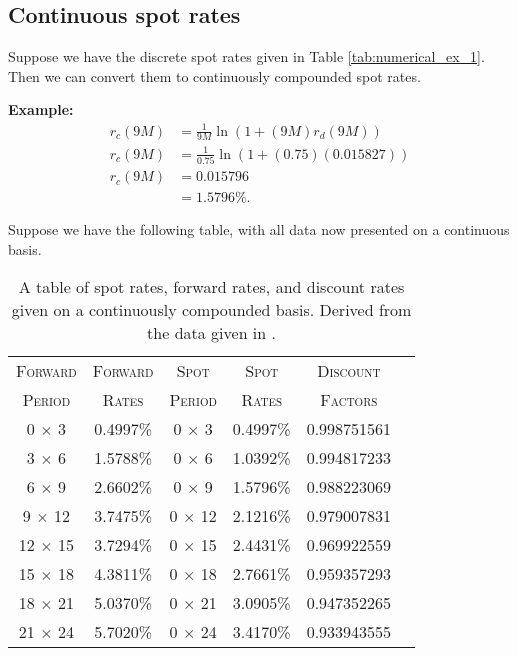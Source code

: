 \subsection{Continuous spot rates}

Suppose we have the discrete spot rates given in Table \ref{tab:numerical_ex_1}. Then we can convert them to continuously compounded spot rates.

\textbf{Example:}
\begin{align}
    r_c(9M) &= \frac{1}{9M} \ln \left( 1 + (9M) r_d(9M)  \right) \\[6pt]
    r_c(9M) &= \frac{1}{0.75} \ln \left( 1 + (0.75)(0.015827) \right) \\[6pt]
    r_c(9M) &= 0.015796 \\
    &= 1.5796\%.
\end{align}

Suppose we have the following table, with all data now presented on a continuous basis.

\begin{table}[ht]
\begin{center}
\begin{tabular}{cccccc}

\toprule
\textsc{Forward} & \textsc{Forward} & \textsc{Spot} & \textsc{Spot} & \textsc{Discount} \\
\textsc{Period} & \textsc{Rates} & \textsc{Period} & \textsc{Rates} & \textsc{Factors}\\
\toprule

0 $\times$ 3 & 0.4997\% & 0 $\times$ 3 & 0.4997\% & 0.998751561 \\
3 $\times$ 6 & 1.5788\% & 0 $\times$ 6 & 1.0392\% & 0.994817233 \\
6 $\times$ 9 & 2.6602\% & 0 $\times$ 9 & 1.5796\% & 0.988223069 \\
9 $\times$ 12 & 3.7475\% & 0 $\times$ 12 & 2.1216\% & 0.979007831 \\
12 $\times$ 15 & 3.7294\% & 0 $\times$ 15 & 2.4431\% & 0.969922559 \\
15 $\times$ 18 & 4.3811\% & 0 $\times$ 18 & 2.7661\% & 0.959357293 \\
18 $\times$ 21 & 5.0370\% & 0 $\times$ 21 & 3.0905\% & 0.947352265 \\
21 $\times$ 24 & 5.7020\% & 0 $\times$ 24 & 3.4170\% & 0.933943555 \\
\toprule

\end{tabular}
\end{center}
\caption[Numerical Example--Continuous Compounding Formulas]{A table of spot rates, forward rates, and discount rates given on a continuously compounded basis. Derived from the data given in \cite{smith2011bond}.}
\label{tab:numerical_ex_2}
\end{table}

